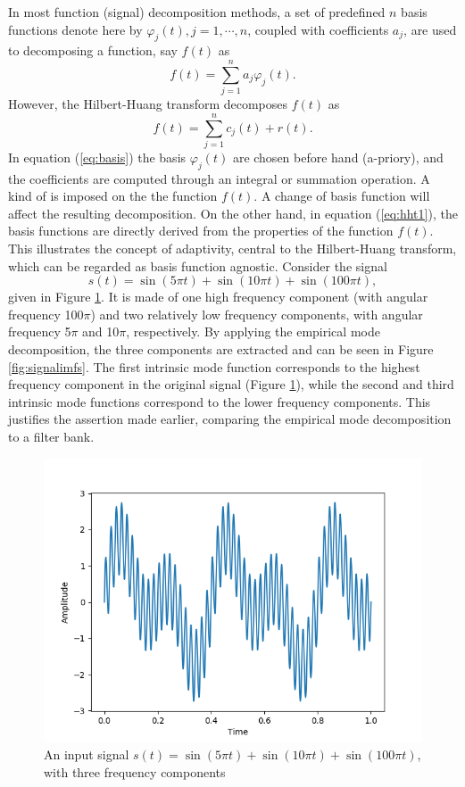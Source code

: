 \documentclass[../Main/thesis.tex]{subfiles}
\begin{document}
 In most function (signal) decomposition methods, a set of predefined $n$ basis functions denote here by $\varphi_{j}(t), j = 1,\cdots,n$, coupled with coefficients $a_{j}$, are used to decomposing a function, say $f(t)$ as 
\begin{equation}\label{eq:basis}
	f(t) = \sum_{j=1}^{n}a_{j}\varphi_{j}(t).
\end{equation}
However, the Hilbert-Huang transform decomposes $f(t)$ as 
\begin{equation}\label{eq:hht1}
f(t) = \sum_{j=1}^{n}c_{j}(t) + r(t).
\end{equation}
In equation (\ref{eq:basis}) the basis $\varphi_{j}(t)$ are chosen before hand (a-priory), and the coefficients are computed through an integral or summation operation. A kind of  is imposed on the the function $f(t)$. A change of basis function will affect the resulting decomposition. On the other hand, in equation (\ref{eq:hht1}), the basis functions are directly derived from the properties of the function $f(t)$. This illustrates the concept of adaptivity, central to the Hilbert-Huang transform, which can be regarded as basis function agnostic.
\justify
Consider the signal
\begin{equation}
	s(t) = \sin(5 \pi t) + \sin(10 \pi t) + \sin(100 \pi t),
\end{equation}
  given in Figure \ref{fig:emd3}. It is made of one high frequency component (with angular frequency 100$\pi$) and two relatively low frequency components, with angular frequency 5$\pi$ and 10$\pi$, respectively. By applying the empirical mode decomposition, the three components are extracted and can be seen in Figure \ref{fig:signalimfs}. The first intrinsic mode function corresponds to the highest frequency component in the original signal (Figure \ref{fig:emd3}), while the second and third intrinsic mode functions correspond to the lower frequency components. This justifies the assertion made earlier, comparing the empirical mode decomposition to a filter bank. 
  \begin{figure}
   \centering
   \includegraphics[width=6in]{../fig/sinusoidal.png} 
   \caption{ An input signal $s(t) = \sin(5 \pi t) + \sin(10 \pi t) +\sin(100 \pi t) $, with three frequency components}
   \label{fig:emd3}
\end{figure}
\end{document}
